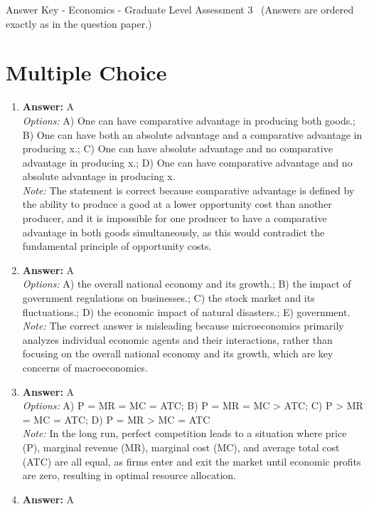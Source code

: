 \documentclass[12pt]{article}
\begin{document}
\begin{center}
Answer Key - Economics - Graduate Level Assessment 3 \
\small (Answers are ordered exactly as in the question paper.)
\end{center}

\section*{Multiple Choice}
\begin{enumerate}[label=\arabic*.]
\item \textbf{Answer:} A
\\ \textit{Options:} A) One can have comparative advantage in producing both goods.; B) One can have both an absolute advantage and a comparative advantage in producing x.; C) One can have absolute advantage and no comparative advantage in producing x.; D) One can have comparative advantage and no absolute advantage in producing x.
\\ \textit{Note:} The statement is correct because comparative advantage is defined by the ability to produce a good at a lower opportunity cost than another producer, and it is impossible for one producer to have a comparative advantage in both goods simultaneously, as this would contradict the fundamental principle of opportunity costs.
\item \textbf{Answer:} A
\\ \textit{Options:} A) the overall national economy and its growth.; B) the impact of government regulations on businesses.; C) the stock market and its fluctuations.; D) the economic impact of natural disasters.; E) government.
\\ \textit{Note:} The correct answer is misleading because microeconomics primarily analyzes individual economic agents and their interactions, rather than focusing on the overall national economy and its growth, which are key concerns of macroeconomics.
\item \textbf{Answer:} A
\\ \textit{Options:} A) P = MR = MC = ATC; B) P = MR = MC \textgreater{} ATC; C) P \textgreater{} MR = MC = ATC; D) P = MR \textgreater{} MC = ATC
\\ \textit{Note:} In the long run, perfect competition leads to a situation where price (P), marginal revenue (MR), marginal cost (MC), and average total cost (ATC) are all equal, as firms enter and exit the market until economic profits are zero, resulting in optimal resource allocation.
\item \textbf{Answer:} A

\end{enumerate}
\end{document}
